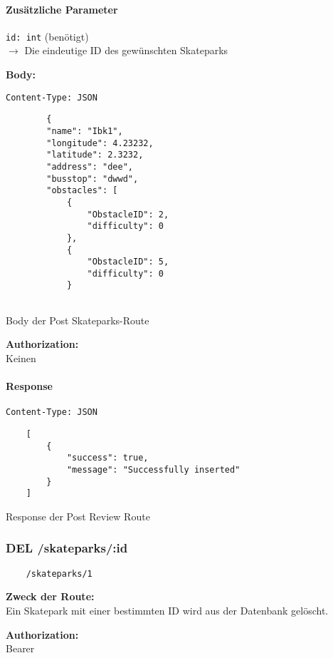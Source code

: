 \paragraph{Zusätzliche Parameter}
\lstinline{id: int} (benötigt) \\
$\rightarrow$ Die eindeutige ID des gewünschten Skateparks


\textbf{Body:} \\
\begin{code}
    \lstinline{Content-Type: JSON}
    \begin{lstlisting}
        {
        "name": "Ibk1",
        "longitude": 4.23232,
        "latitude": 2.3232,
        "address": "dee",
        "busstop": "dwwd",
        "obstacles": [
            {
                "ObstacleID": 2,
                "difficulty": 0
            },
            {
                "ObstacleID": 5,
                "difficulty": 0
            }
        
    \end{lstlisting}
    \caption{Body der Post Skateparks-Route }
\end{code}

\textbf{Authorization:} \\
Keinen

\paragraph{Response }
\begin{code}
    \lstinline{Content-Type: JSON}
    \begin{lstlisting}
    [
        {
            "success": true,
            "message": "Successfully inserted"
        }
    ]
    \end{lstlisting}
    \caption{Response der Post Review Route}
\end{code}

\pagebreak


\subsubsection{DEL /skateparks/:id}

\begin{lstlisting}
    /skateparks/1
\end{lstlisting}

\textbf{Zweck der Route:} \\
Ein Skatepark mit einer bestimmten ID wird aus der Datenbank gelöscht.

\textbf{Authorization:} \\
Bearer

